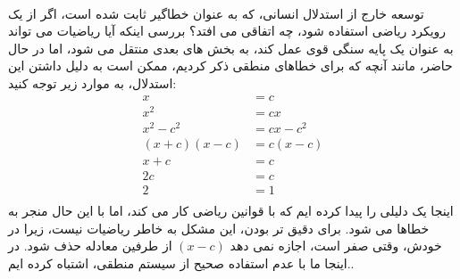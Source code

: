 \documentclass[10pt,a4paper]{article}
\begin{document}
                \\
                توسعه خارج از استدلال انسانی، که به عنوان خطاگیر ثابت شده است، اگر از یک رویکرد ریاضی استفاده شود، چه اتفاقی می افتد؟ بررسی اینکه آیا ریاضیات می تواند به عنوان یک پایه سنگی قوی عمل کند، به بخش های بعدی منتقل می شود، اما در حال حاضر، مانند آنچه که برای خطاهای منطقی ذکر کردیم، ممکن است به دلیل داشتن این استدلال، به موارد زیر توجه کنید:
                \begin{align*}
                    x &=c \\
                    x^2 &= cx\\
                    x^2 - c^2 &= cx - c^2\\
                    (x+c)(x-c) &= c(x-c)\\
                    x + c &= c \\
                    2c &= c \\ 
                    2 &=1 \\ 
                \end{align*}
اینجا یک دلیلی را پیدا کرده ایم که با قوانین ریاضی کار می کند، اما با این حال منجر به خطاها می شود. برای دقیق تر بودن، این مشکل به خاطر ریاضیات نیست، زیرا در خودش، وقتی صفر است، اجازه نمی دهد $(x-c)$ از طرفین معادله حذف شود. در اینجا ما با عدم استفاده صحیح از سیستم منطقی، اشتباه کرده ایم.. \cite{CW/E}
                \\
                \\
\end{document}
